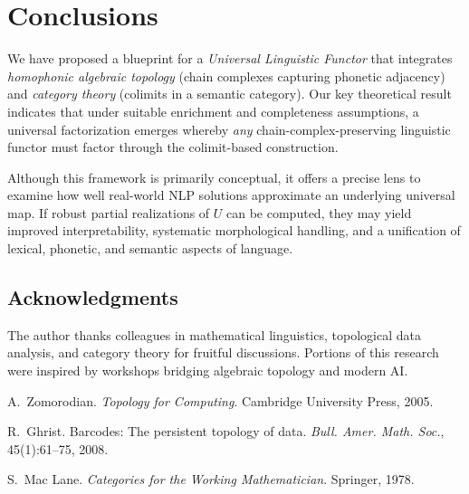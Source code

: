 \documentclass[11pt]{article}
\theoremstyle{definition}
\theoremstyle{remark}
\begin{document}
\section{Conclusions}
We have proposed a blueprint for a \emph{Universal Linguistic Functor} that integrates \emph{homophonic algebraic topology} (chain complexes capturing phonetic adjacency) and \emph{category theory} (colimits in a semantic category). Our key theoretical result indicates that under suitable enrichment and completeness assumptions, a universal factorization emerges whereby \emph{any} chain-complex-preserving linguistic functor must factor through the colimit-based construction. 

Although this framework is primarily conceptual, it offers a precise lens to examine how well real-world NLP solutions approximate an underlying universal map. If robust partial realizations of \(U\) can be computed, they may yield improved interpretability, systematic morphological handling, and a unification of lexical, phonetic, and semantic aspects of language.

\subsection*{Acknowledgments}
The author thanks colleagues in mathematical linguistics, topological data analysis, and category theory for fruitful discussions. Portions of this research were inspired by workshops bridging algebraic topology and modern AI.


\begin{thebibliography}{99}

A.~Zomorodian.
\newblock \emph{Topology for Computing}.
\newblock Cambridge University Press, 2005.

R.~Ghrist.
\newblock Barcodes: The persistent topology of data.
\newblock \emph{Bull. Amer. Math. Soc.}, 45(1):61--75, 2008.

S.~Mac Lane.
\newblock \emph{Categories for the Working Mathematician}.
\newblock Springer, 1978.

\end{thebibliography}
\end{document}
